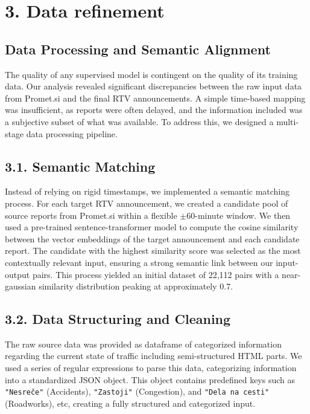 \documentclass[fleqn,moreauthors,10pt]{ds_report}
\begin{document}
\section*{3. Data refinement}

\subsection*{Data Processing and Semantic Alignment}
The quality of any supervised model is contingent on the quality of its training data. Our analysis revealed significant discrepancies between the raw input data from Promet.si and the final RTV announcements. A simple time-based mapping was insufficient, as reports were often delayed, and the information included was a subjective subset of what was available. To address this, we designed a multi-stage data processing pipeline.



\subsection*{3.1. Semantic Matching}
Instead of relying on rigid timestamps, we implemented a semantic matching process. For each target RTV announcement, we created a candidate pool of source reports from Promet.si within a flexible $\pm$60-minute window. We then used a pre-trained sentence-transformer model to compute the cosine similarity between the vector embeddings of the target announcement and each candidate report. The candidate with the highest similarity score was selected as the most contextually relevant input, ensuring a strong semantic link between our input-output pairs. This process yielded an initial dataset of 22,112 pairs with a near-gaussian similarity distribution peaking at approximately 0.7.

\subsection*{3.2. Data Structuring and Cleaning}
The raw source data was provided as dataframe of categorized information regarding  the current state of traffic including semi-structured HTML parts. We used a series of regular expressions to parse this data, categorizing information into a standardized JSON object. This object contains predefined keys such as \texttt{"Nesreče"} (Accidents), \texttt{"Zastoji"} (Congestion), and \texttt{"Dela na cesti"} (Roadworks), etc, creating a fully structured and categorized input.
\end{document}
